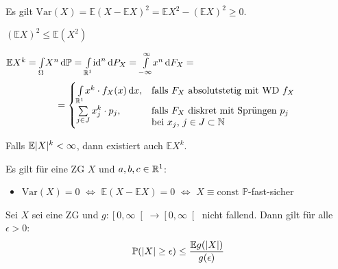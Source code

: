 \documentclass{cheat-sheet}
\renewcommand{\P}{\mathbb{P}} %
\newcommand{\E}{\mathbb{E}} %
\newcommand{\Var}{\mathrm{Var}} %
\begin{document}
\begin{lem}
  Es gilt $\Var(X) = \E (X {-} \E X)^2 = \E X^2 - (\E X)^2 \geq 0$.
\end{lem}

\begin{kor}
  $(\E X)^2 \leq \E (X^2)$
\end{kor}

\begin{lem}
  $\E X^k = \Int{\Omega}{}{X^n}{\P} = \Int{\R^1}{}{\id^n}{P_X} = \Int{-\infty}{\infty}{x^n}{F_X} =$
  \[
    \qquad = \begin{cases}
      \Int{\R^1}{}{x^k \cdot f_X(x)}{x}, & \text{falls $F_X$ absolutstetig mit WD $f_X$} \\
      \sum_{j \in J} x_j^k \cdot p_j, & \parbox[t]{0.5\textwidth}{falls $F_X$ diskret mit Sprüngen $p_j$ \\ bei $x_j$, $j \in J \subset \N$}
    \end{cases}
  \]
\end{lem}

\begin{bem}
  Falls $\E \abs{X}^k < \infty$, dann existiert auch $\E X^k$.
\end{bem}

\begin{lem}
  Es gilt für eine ZG $X$ und $a, b, c \in \mathbb{R}^1$:
  \begin{itemize}
    \item $\Var(X) = 0$ $\iff$ $\E (X - \E X) = 0$ $\iff$ $X \equiv \mathrm{const}$ $\P$-fast-sicher
  \end{itemize}
\end{lem}


\begin{satz}
  Sei $X$ sei eine ZG und $g : \left[ 0, \infty \right[ \to \left[ 0, \infty \right[$ nicht fallend. Dann gilt für alle $\epsilon > 0$:
  \[ \P(\abs{X} \geq \epsilon) \leq \frac{\E g(\abs{X})}{g(\epsilon)} \]
\end{satz}
\end{document}
